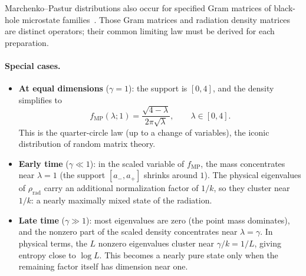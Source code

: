 \documentclass[11pt,letterpaper]{article}
\theoremstyle{plain}
\theoremstyle{definition}
\theoremstyle{remark}
\begin{document}
Marchenko--Pastur distributions also occur for specified Gram matrices of
black-hole microstate families~\cite{muck2024,balasubramanianetal2024}.
Those Gram matrices and radiation density matrices are distinct operators;
their common limiting law must be derived for each preparation.

\paragraph{Special cases.}
\begin{itemize}
  \item \textbf{At equal dimensions} ($\gamma = 1$): the support is
    $[0, 4]$, and the density simplifies to
    \begin{equation}
      f_{\mathrm{MP}}(\lambda; 1)
      = \frac{\sqrt{4 - \lambda}}{2\pi\sqrt{\lambda}},
      \qquad \lambda \in [0, 4].
      \label{eq07:mp_page_time}
    \end{equation}
    This is the quarter-circle law (up to a change of variables), the
    iconic distribution of random matrix theory.

  \item \textbf{Early time} ($\gamma \ll 1$): in the scaled variable of
    $f_{\mathrm{MP}}$, the mass concentrates near $\lambda = 1$ (the
    support $[a_-, a_+]$ shrinks around $1$).  The physical eigenvalues
    of $\rho_{\mathrm{rad}}$ carry an additional normalization factor
    of $1/k$, so they cluster near $1/k$: a nearly maximally mixed
    state of the radiation.

  \item \textbf{Late time} ($\gamma \gg 1$): most eigenvalues are zero
    (the point mass dominates), and the nonzero part of the scaled
    density concentrates near $\lambda = \gamma$.  In physical terms,
    the $L$ nonzero eigenvalues cluster near $\gamma/k = 1/L$,
    giving entropy close to $\log L$.  This becomes a nearly pure state only
    when the remaining factor itself has dimension near one.
\end{itemize}
\end{document}
